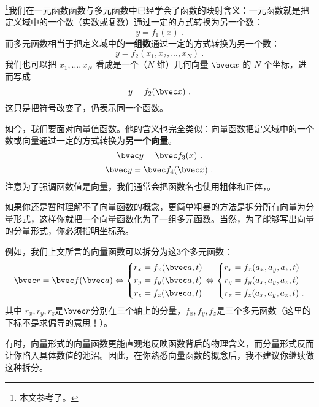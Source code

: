 
\begin{issues}
\end{issues}


\footnote{本文参考了\cite{Thomas}。}我们在一元函数函数与多元函数中已经学会了函数的映射含义：一元函数就是把定义域中的一个数（实数或复数）通过一定的方式转换为另一个数：
\begin{equation}
y=f_1(x)~.
\end{equation}
而多元函数相当于把定义域中的\textbf{一组数}通过一定的方式转换为另一个数：
\begin{equation}
y=f_2(x_1, x_2,...,x_N)~.
\end{equation}
我们也可以把 $x_1,\dots,x_N$ 看成是一个（$N$ 维）几何向量 $\bvec x$ 的 $N$ 个坐标，进而写成
\begin{equation}
y=f_2(\bvec x)~.
\end{equation}
这只是把符号改变了，仍表示同一个函数。

如今，我们要面对向量值函数。他的含义也完全类似：向量函数把定义域中的一个数或向量通过一定的方式转换为\textbf{另一个向量}。
\begin{equation}
\bvec y = \bvec f_3 (x)~.
\end{equation}
\begin{equation}
\bvec y = \bvec f_4(\bvec x)~.
\end{equation}
注意为了强调函数值是向量，我们通常会把函数名也使用粗体和正体，。

如果你还是暂时理解不了向量函数的概念，更简单粗暴的方法是拆分所有向量为分量形式，这样你就把一个向量函数化为了一组多元函数。当然，为了能够写出向量的分量形式，你必须指明坐标系。

例如，我们上文所言的向量函数可以拆分为这$3$个多元函数：
$$
\bvec r = \bvec f (\bvec a)
\Leftrightarrow
\left \{
\begin{aligned}
r_x &= f_x(\bvec a, t)\\
r_y &= f_y(\bvec a, t)\\
r_z &= f_z(\bvec a, t)\\
\end{aligned}
\right.
\Leftrightarrow
\left \{
\begin{aligned}
r_x &= f_x(a_x,a_y,a_z,t)\\
r_y &= f_y(a_x,a_y,a_z,t)\\
r_z &= f_z(a_x,a_y,a_z,t)~.\\
\end{aligned}
\right.
$$
其中 $r_x, r_y, r_z$是$\bvec r$分别在三个轴上的分量，$f_x,f_y,f_z$是三个多元函数（这里的下标不是求偏导的意思！）。

有时，向量形式的向量函数更能直观地反映函数背后的物理含义，而分量形式反而让你陷入具体数值的池沼。因此，在你熟悉向量函数的概念后，我不建议你继续做这种拆分。
